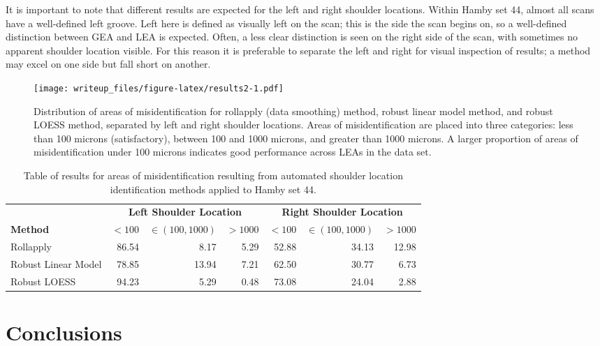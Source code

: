 \documentclass[12pt]{article}
\begin{document}
It is important to note that different results are expected for the left
and right shoulder locations. Within Hamby set 44, almost all scans have
a well-defined left groove. Left here is defined as visually left on the
scan; this is the side the scan begins on, so a well-defined distinction
between GEA and LEA is expected. Often, a less clear distinction is seen
on the right side of the scan, with sometimes no apparent shoulder
location visible. For this reason it is preferable to separate the left
and right for visual inspection of results; a method may excel on one
side but fall short on another.

\begin{figure}
\centering
\texttt{[image: writeup\_files/figure-latex/results2-1.pdf]}
\caption{\label{results2}Distribution of areas of misidentification for
rollapply (data smoothing) method, robust linear model method, and
robust LOESS method, separated by left and right shoulder locations.
Areas of misidentification are placed into three categories: less than
100 microns (satisfactory), between 100 and 1000 microns, and greater
than 1000 microns. A larger proportion of areas of misidentification
under 100 microns indicates good performance across LEAs in the data
set.}
\end{figure}

\begin{table}[]
\centering
\begin{tabular}{lrrr|rrr}
& \multicolumn{3}{c}{\textbf{Left Shoulder Location}} & \multicolumn{3}{c}{\textbf{Right Shoulder Location}} \\
\textbf{Method} & $< 100$ & $ \in (100, 1000) $ & $>1000$ & $< 100$ & $\in (100, 1000)$ & $>1000$ \\ \hline
Rollapply & 86.54 & 8.17 & 5.29 & 52.88& 34.13&12.98  \\ \hline
Robust Linear Model & 78.85 & 13.94 & 7.21 & 62.50 & 30.77&6.73 \\ \hline
Robust LOESS & 94.23 & 5.29 & 0.48 & 73.08& 24.04&2.88\\ \hline
\end{tabular}
\caption{Table of results for areas of misidentification resulting from automated shoulder location identification methods applied to Hamby set 44. }
\label{results-table}
\end{table}

\section{Conclusions}
\end{document}
